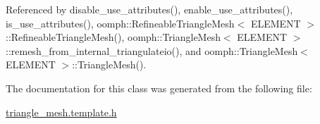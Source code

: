Referenced by disable\+\_\+use\+\_\+attributes(), enable\+\_\+use\+\_\+attributes(), is\+\_\+use\+\_\+attributes(), oomph\+::\+Refineable\+Triangle\+Mesh$<$ E\+L\+E\+M\+E\+N\+T $>$\+::\+Refineable\+Triangle\+Mesh(), oomph\+::\+Triangle\+Mesh$<$ E\+L\+E\+M\+E\+N\+T $>$\+::remesh\+\_\+from\+\_\+internal\+\_\+triangulateio(), and oomph\+::\+Triangle\+Mesh$<$ E\+L\+E\+M\+E\+N\+T $>$\+::\+Triangle\+Mesh().



The documentation for this class was generated from the following file\+:\begin{DoxyCompactItemize}
\item 
\hyperlink{triangle__mesh_8template_8h}{triangle\+\_\+mesh.\+template.\+h}\end{DoxyCompactItemize}
